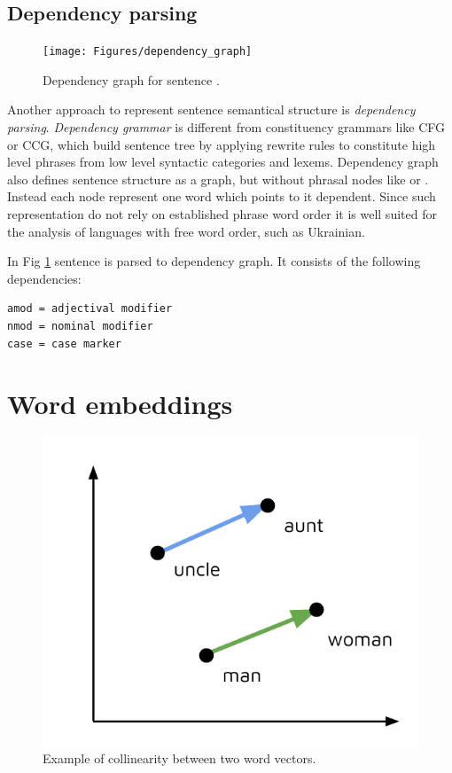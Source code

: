 \subsection{Dependency parsing}

\begin{figure}[h]
\centering
\texttt{[image: Figures/dependency\_graph]}
\decoRule
\caption[Dependency graph]{Dependency graph for sentence \protect\footnotemark.}
\label{fig:dependency_graph}
\end{figure}


Another approach to represent sentence semantical structure is \emph{dependency parsing}. \emph{Dependency grammar} is different from constituency grammars like CFG or CCG, which build sentence tree by applying rewrite rules to constitute high level phrases from low level syntactic categories and lexems. Dependency graph also defines sentence structure as a graph, but without phrasal nodes like  or . Instead each node represent one word which points to it dependent. Since such representation do not rely on established phrase word order it is well suited for the analysis of languages with free word order, such as Ukrainian.

In Fig \ref{fig:dependency_graph} sentence  is parsed to dependency graph. It consists of the following dependencies: 

\begin{verbatim}
amod = adjectival modifier
nmod = nominal modifier
case = case marker
\end{verbatim}

\section{Word embeddings}

\begin{figure}[h]
\centering
\includegraphics{Figures/word_embeddings}
\decoRule
\caption[Word vectors]{Example of collinearity between two word vectors.}
\label{fig:word_embeddings}
\end{figure}


